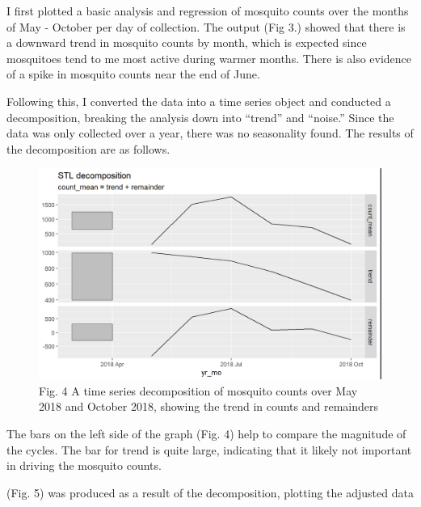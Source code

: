 \documentclass[
  letterpaper,
  DIV=11,
  numbers=noendperiod]{scrartcl}
\begin{document}
I first plotted a basic analysis and regression of mosquito counts over
the months of May - October per day of collection. The output (Fig 3.)
showed that there is a downward trend in mosquito counts by month, which
is expected since mosquitoes tend to me most active during warmer
months. There is also evidence of a spike in mosquito counts near the
end of June.

Following this, I converted the data into a time series object and
conducted a decomposition, breaking the analysis down into ``trend'' and
``noise.'' Since the data was only collected over a year, there was no
seasonality found. The results of the decomposition are as follows.

\begin{figure}

{\centering \includegraphics{images/decomp_components.png}

}

\caption{Fig. 4 A time series decomposition of mosquito counts over May
2018 and October 2018, showing the trend in counts and remainders}

\end{figure}

The bars on the left side of the graph (Fig. 4) help to compare the
magnitude of the cycles. The bar for trend is quite large, indicating
that it likely not important in driving the mosquito counts.

(Fig. 5) was produced as a result of the decomposition, plotting the
adjusted data
\end{document}
